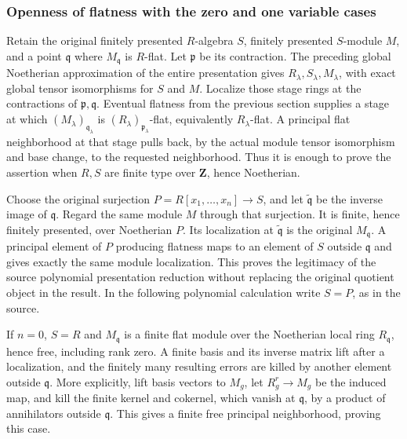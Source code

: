\subsubsection{Openness of flatness with the zero and one variable cases}\label{openness-of-flatness-with-the-zero-and-one-variable-cases}

Retain the original finitely presented \(R\)-algebra \(S\), finitely presented \(S\)-module \(M\), and a point \(\mathfrak q\) where \(M_{\mathfrak q}\) is \(R\)-flat. Let \(\mathfrak p\) be its contraction. The preceding global Noetherian approximation of the entire presentation gives \(R_\lambda,S_\lambda,M_\lambda\), with exact global tensor isomorphisms for \(S\) and \(M\). Localize those stage rings at the contractions of \(\mathfrak p,\mathfrak q\). Eventual flatness from the previous section supplies a stage at which \((M_\lambda)_{\mathfrak q_\lambda}\) is \((R_\lambda)_{\mathfrak p_\lambda}\)-flat, equivalently \(R_\lambda\)-flat. A principal flat neighborhood at that stage pulls back, by the actual module tensor isomorphism and base change, to the requested neighborhood. Thus it is enough to prove the assertion when \(R,S\) are finite type over \(\mathbf Z\), hence Noetherian.

Choose the original surjection \(P=R[x_1,\ldots,x_n]\to S\), and let \(\widetilde{\mathfrak q}\) be the inverse image of \(\mathfrak q\). Regard the same module \(M\) through that surjection. It is finite, hence finitely presented, over Noetherian \(P\). Its localization at \(\widetilde{\mathfrak q}\) is the original \(M_{\mathfrak q}\). A principal element of \(P\) producing flatness maps to an element of \(S\) outside \(\mathfrak q\) and gives exactly the same module localization. This proves the legitimacy of the source polynomial presentation reduction without replacing the original quotient object in the result. In the following polynomial calculation write \(S=P\), as in the source.

If \(n=0\), \(S=R\) and \(M_{\mathfrak q}\) is a finite flat module over the Noetherian local ring \(R_{\mathfrak q}\), hence free, including rank zero. A finite basis and its inverse matrix lift after a localization, and the finitely many resulting errors are killed by another element outside \(\mathfrak q\). More explicitly, lift basis vectors to \(M_g\), let \(R_g^r\to M_g\) be the induced map, and kill the finite kernel and cokernel, which vanish at \(\mathfrak q\), by a product of annihilators outside \(\mathfrak q\). This gives a finite free principal neighborhood, proving this case.

